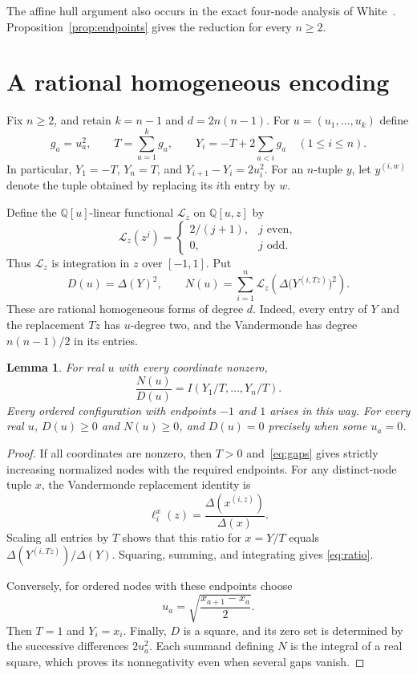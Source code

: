 \documentclass[11pt,leqno]{amsart}
\newtheorem{lemma}[theorem]{Lemma}
\theoremstyle{definition}
\theoremstyle{remark}
\numberwithin{equation}{section}
\newcommand{\Q}{\mathbb Q}
\newcommand{\Lz}{\mathcal L_z}
\begin{document}
The affine hull argument also occurs in the exact four-node analysis
of White~\cite{White}. Proposition~\ref{prop:endpoints} gives the
reduction for every $n\geq2$.

\section{A rational homogeneous encoding}\label{sec:encoding}

Fix $n\geq2$, and retain $k=n-1$ and $d=2n(n-1)$. For
$u=(u_1,\ldots,u_k)$ define
\begin{equation}\label{eq:gaps}
 g_a=u_a^2,\qquad T=\sum_{a=1}^k g_a,\qquad
 Y_i=-T+2\sum_{a<i}g_a\quad(1\leq i\leq n).
\end{equation}
In particular, $Y_1=-T$, $Y_n=T$, and $Y_{i+1}-Y_i=2u_i^2$.
For an $n$-tuple $y$, let $y^{(i,w)}$ denote the tuple obtained by
replacing its $i$th entry by $w$.

Define the $\Q[u]$-linear functional $\Lz$ on $\Q[u,z]$ by
\begin{equation}\label{eq:moment-functional}
 \Lz(z^j)=
 \begin{cases}
  2/(j+1),&j\text{ even},\\
  0,&j\text{ odd}.
 \end{cases}
\end{equation}
Thus $\Lz$ is integration in $z$ over $[-1,1]$. Put
\begin{equation}\label{eq:ND}
 D(u)=\Delta(Y)^2,\qquad
 N(u)=\sum_{i=1}^n\Lz\!\left(\Delta\bigl(Y^{(i,Tz)}\bigr)^2\right).
\end{equation}
These are rational homogeneous forms of degree $d$. Indeed, every
entry of $Y$ and the replacement $Tz$ has $u$-degree two, and the
Vandermonde has degree $n(n-1)/2$ in its entries.

\begin{lemma}\label{lem:encoding}
For real $u$ with every coordinate nonzero,
\begin{equation}\label{eq:ratio}
 \frac{N(u)}{D(u)}=I(Y_1/T,\ldots,Y_n/T).
\end{equation}
Every ordered configuration with endpoints $-1$ and $1$ arises in
this way. For every real $u$, $D(u)\geq0$ and $N(u)\geq0$, and
$D(u)=0$ precisely when some $u_a=0$.
\end{lemma}

\begin{proof}
If all coordinates are nonzero, then $T>0$ and~\eqref{eq:gaps} gives
strictly increasing normalized nodes with the required endpoints.
For any distinct-node tuple $x$, the Vandermonde replacement identity is
\[
 \ell_i^x(z)=\frac{\Delta(x^{(i,z)})}{\Delta(x)}.
\]
Scaling all entries by $T$ shows that this ratio for $x=Y/T$ equals
$\Delta(Y^{(i,Tz)})/\Delta(Y)$. Squaring, summing, and integrating gives
\eqref{eq:ratio}.

Conversely, for ordered nodes with these endpoints choose
\[
 u_a=\sqrt{\frac{x_{a+1}-x_a}{2}}.
\]
Then $T=1$ and $Y_i=x_i$.
Finally, $D$ is a square, and its zero set is determined by the
successive differences $2u_a^2$. Each summand defining $N$ is the
integral of a real square, which proves its nonnegativity even when
several gaps vanish.
\end{proof}
\end{document}
